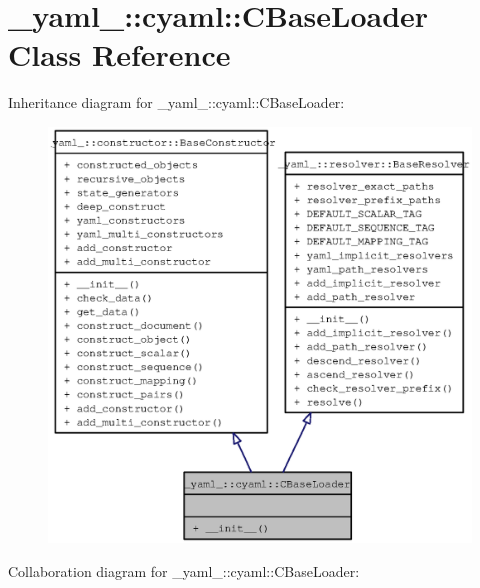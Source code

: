 \section{\_\-yaml\_\-::cyaml::CBaseLoader Class Reference}
\label{class__yaml___1_1cyaml_1_1CBaseLoader}
Inheritance diagram for \_\-yaml\_\-::cyaml::CBaseLoader:\nopagebreak
\begin{figure}[H]
\begin{center}
\leavevmode
\includegraphics[width=400pt]{class__yaml___1_1cyaml_1_1CBaseLoader__inherit__graph}
\end{center}
\end{figure}
Collaboration diagram for \_\-yaml\_\-::cyaml::CBaseLoader:\nopagebreak
